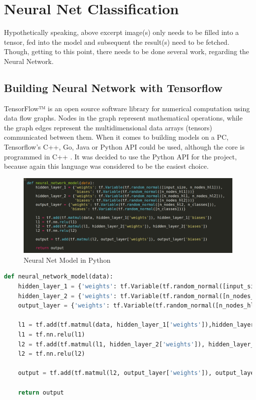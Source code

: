 \section{Neural Net Classification}
Hypothetically speaking, above excerpt image(s) only needs to be filled into a tensor, fed into the model and subsequent the result(s) need to be fetched. Though, getting to this point, there needs to be done several work, regarding the Neural Network.  

\subsection{Building Neural Network with Tensorflow}
TensorFlow™ is an open source software library for numerical computation using data flow graphs. Nodes in the graph represent mathematical operations, while the graph edges represent the multidimensional data arrays (tensors) communicated between them. \cite{tensorflow} When it comes to building models on a PC, Tensorflow's C++, Go, Java or Python API could be used, although the core is programmed in C++ \cite{tensorflowcore}. It was decided to use the Python API for the project, because again this language was considered to be the easiest choice. \newline
\begin{figure}[H]
	\centering
	\minipage{\textwidth}
	\includegraphics[width=\linewidth]{images/neuralnetmodelcode.png}
	\caption{Neural Net Model in Python}\label{fig:NNmodelPyth}
	\endminipage\hfill
\end{figure}


\begin{lstlisting}[language=python]
def neural_network_model(data):
	hidden_layer_1 = {'weights': tf.Variable(tf.random_normal([input_size, n_nodes_hl1])), 'biases': tf.Variable(tf.random_normal([n_nodes_hl1]))}
	hidden_layer_2 = {'weights': tf.Variable(tf.random_normal([n_nodes_hl1, n_nodes_hl2])), 'biases': tf.Variable(tf.random_normal([n_nodes_hl2]))}
	output_layer = {'weights': tf.Variable(tf.random_normal([n_nodes_hl2, n_classes])), 'biases': tf.Variable(tf.random_normal([n_classes]))}
	
	l1 = tf.add(tf.matmul(data, hidden_layer_1['weights']),hidden_layer_1['biases'])
	l1 = tf.nn.relu(l1)
	l2 = tf.add(tf.matmul(l1, hidden_layer_2['weights']), hidden_layer_2['biases'])
	l2 = tf.nn.relu(l2)
	
	output = tf.add(tf.matmul(l2, output_layer['weights']), output_layer['biases'])
	
	return output

\end{lstlisting}

